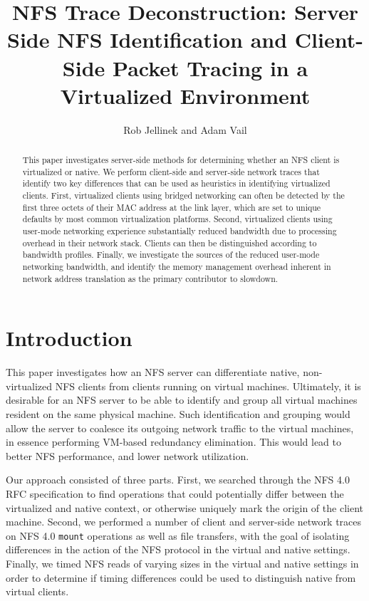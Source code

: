 \documentclass[11pt,pdftex,twocolumn]{article}
\title{NFS Trace Deconstruction: 
Server Side NFS Identification and Client-Side Packet Tracing in a Virtualized Environment}
\author{Rob Jellinek and Adam Vail}
\begin{document}
\maketitle

\begin{abstract}
This paper investigates server-side methods for determining whether an NFS client is virtualized or native. We perform client-side and server-side network traces that identify two key differences that can be used as heuristics in identifying virtualized clients. First, virtualized clients using bridged networking can often be detected by the first three octets of their MAC address at the link layer, which are set to unique defaults by most common virtualization platforms. Second, virtualized clients using user-mode networking experience substantially reduced bandwidth due to processing overhead in their network stack. Clients can then be distinguished according to bandwidth profiles. Finally, we investigate the sources of the reduced user-mode networking bandwidth, and identify the memory management overhead inherent in network address translation as the primary contributor to slowdown.
\end{abstract}

\section{Introduction}
This paper investigates how an NFS server can differentiate native, non-virtualized NFS clients from clients running on virtual machines. 
Ultimately, it is desirable for an NFS server to be able to identify and group all virtual machines resident on the same physical machine. Such identification and grouping would allow the server to coalesce its outgoing network traffic to the virtual machines, in essence performing VM-based redundancy elimination. This would lead to better NFS performance, and lower network utilization.

Our approach consisted of three parts. First, we searched through the NFS 4.0 RFC specification \cite{shepler2003network} to find operations that could potentially differ between the virtualized and native context, or otherwise uniquely mark the origin of the client machine. Second, we performed a number of client and server-side network traces on NFS 4.0 \texttt{mount} operations as well as file transfers, with the goal of isolating differences in the action of the NFS protocol in the virtual and native settings. Finally, we timed NFS reads of varying sizes in the virtual and native settings in order to determine if timing differences could be used to distinguish native from virtual clients. 
\end{document}
